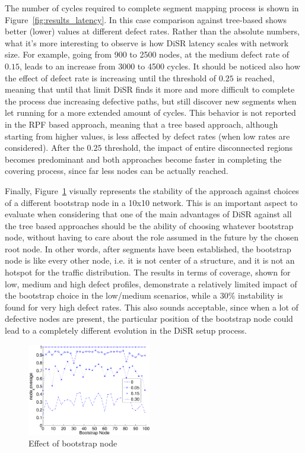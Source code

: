 The number of cycles required to complete segment mapping process
is shown in Figure~\ref{fig:results_latency}. In this case comparison
against tree-based shows better (lower) values at different defect
rates.  Rather than the absolute numbers, what it's more interesting
to observe is how DiSR latency scales with network size. For example,
going from 900 to 2500 nodes, at the medium defect rate of $0.15$,
leads to an increase from 3000 to 4500 cycles. It should be noticed
also how the effect of defect rate is increasing until the threshold
of $0.25$ is reached, meaning that until that limit DiSR finds it more
and more difficult to complete the process due increasing defective
paths, but still discover new segments when let running for a more
extended amount of cycles. This behavior is not reported in the RPF
based approach, meaning that a tree based approach, although starting
from higher values, is less affected by defect rates (when low rates
are considered).
After the $0.25$ threshold, the impact of entire disconnected regions
becomes predominant and both approaches become faster in completing
the covering process, since far less nodes can be actually reached. 

Finally, Figure~\ref{fig:results_bootstrap} visually represents  the
stability of the approach against choices of a different bootstrap
node in a 10x10 network.  This is an important aspect to evaluate when
considering that one of the main advantages of DiSR against all the
tree based approaches should be the ability of choosing whatever
bootstrap node, without having to care about the role assumed in the
future by the chosen root node.  In other words, after segments have
been established, the bootstrap node is like every other node, i.e. it
is not center of a structure, and it is not an hotspot for the traffic
distribution. The results in terms of coverage,  shown for low, medium
and high defect profiles, demonstrate a relatively limited
impact of the bootstrap choice in the low/medium scenarios, while a
$30\%$ instability is found for very high defect rates. This also
sounds acceptable, since when a lot of defective nodes are present, the
particular position of the bootstrap node could lead to a completely
different evolution in the DiSR setup process.

\begin{figure}
\centering
\includegraphics[width=0.48\textwidth]{pictures/set3.eps}
\caption{Effect of bootstrap node}
\label{fig:results_bootstrap}
\end{figure}

